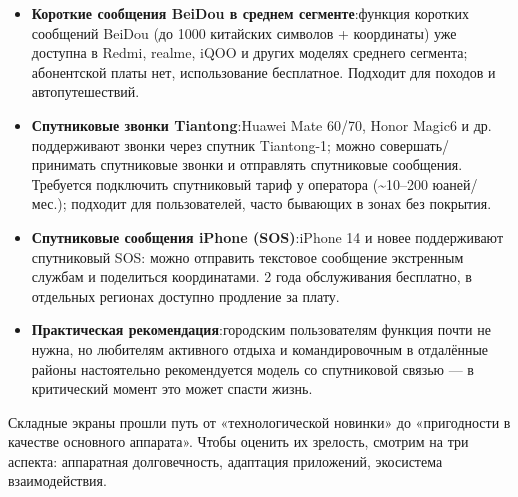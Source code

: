 \begin{itemize}
  \item \textbf{Короткие сообщения BeiDou в среднем сегменте}:функция коротких сообщений BeiDou (до 1000 китайских символов + координаты) уже доступна в Redmi, realme, iQOO и других моделях среднего сегмента; абонентской платы нет, использование бесплатное. Подходит для походов и автопутешествий.
  \item \textbf{Спутниковые звонки Tiantong}:Huawei Mate 60/70, Honor Magic6 и др. поддерживают звонки через спутник Tiantong-1; можно совершать/принимать спутниковые звонки и отправлять спутниковые сообщения. Требуется подключить спутниковый тариф у оператора (\textasciitilde{}10–200 юаней/мес.); подходит для пользователей, часто бывающих в зонах без покрытия.
  \item \textbf{Спутниковые сообщения iPhone (SOS)}:iPhone 14 и новее поддерживают спутниковый SOS: можно отправить текстовое сообщение экстренным службам и поделиться координатами. 2 года обслуживания бесплатно, в отдельных регионах доступно продление за плату.
  \item \textbf{Практическая рекомендация}:городским пользователям функция почти не нужна, но любителям активного отдыха и командировочным в отдалённые районы настоятельно рекомендуется модель со спутниковой связью — в критический момент это может спасти жизнь.
\end{itemize}


Складные экраны прошли путь от «технологической новинки» до «пригодности в качестве основного аппарата». Чтобы оценить их зрелость, смотрим на три аспекта: аппаратная долговечность, адаптация приложений, экосистема взаимодействия.

